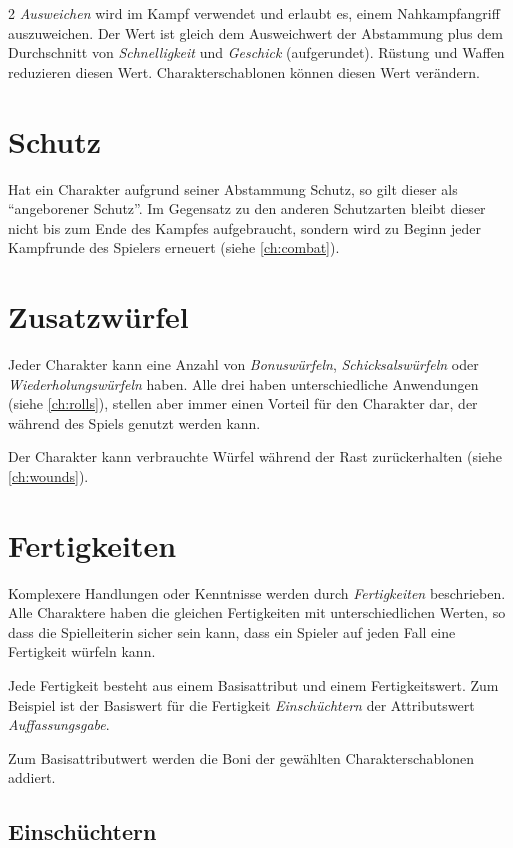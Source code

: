 \begin{multicols}{2}
\textit{Ausweichen} wird im Kampf verwendet und erlaubt es, einem Nahkampfangriff auszuweichen. Der Wert ist gleich dem Ausweichwert der Abstammung plus dem Durchschnitt von \textit{Schnelligkeit} und \textit{Geschick} (aufgerundet). Rüstung und Waffen reduzieren diesen Wert. Charakterschablonen können diesen Wert verändern.

\section{Schutz}

Hat ein Charakter aufgrund seiner Abstammung Schutz, so gilt dieser als ``angeborener Schutz''. Im Gegensatz zu den anderen Schutzarten bleibt dieser nicht bis zum Ende des Kampfes aufgebraucht, sondern wird zu Beginn jeder Kampfrunde des Spielers erneuert (siehe \cref{ch:combat}).

\section{Zusatzwürfel}

Jeder Charakter kann eine Anzahl von \textit{Bonuswürfeln}, \textit{Schicksalswürfeln} oder \textit{Wiederholungswürfeln} haben. Alle drei haben unterschiedliche Anwendungen (siehe \cref{ch:rolls}), stellen aber immer einen Vorteil für den Charakter dar, der während des Spiels genutzt werden kann.

Der Charakter kann verbrauchte Würfel während der Rast zurückerhalten (siehe \cref{ch:wounds}).

\section{Fertigkeiten}

Komplexere Handlungen oder Kenntnisse werden durch \textit{Fertigkeiten} beschrieben. Alle Charaktere haben die gleichen Fertigkeiten mit unterschiedlichen Werten, so dass die Spielleiterin sicher sein kann, dass ein Spieler auf jeden Fall eine Fertigkeit würfeln kann.

Jede Fertigkeit besteht aus einem Basisattribut und einem Fertigkeitswert. Zum Beispiel ist der Basiswert für die Fertigkeit \textit{Einschüchtern} der Attributswert \textit{Auffassungsgabe}.

Zum Basisattributwert werden die Boni der gewählten Charakterschablonen addiert.

\subsection{Einschüchtern}


\end{multicols}
